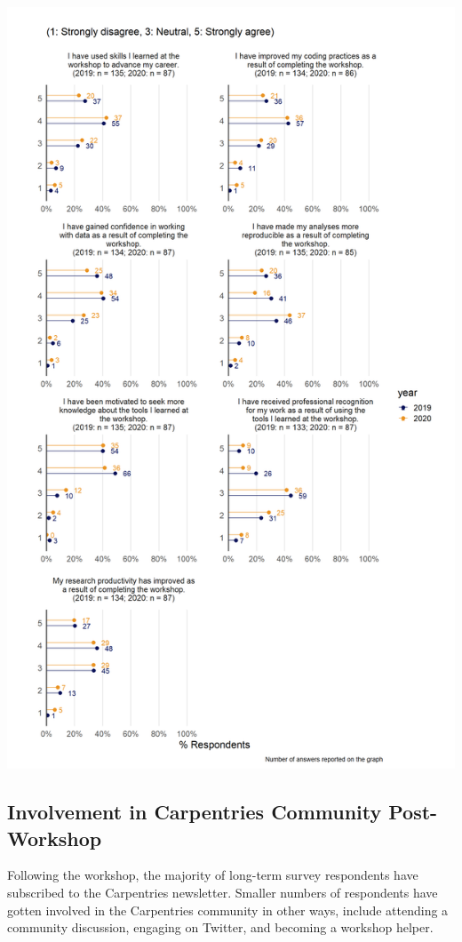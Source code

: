 \documentclass[
]{article}
\makeatletter
\def\maxwidth{\ifdim\Gin@nat@width>\linewidth\linewidth\else\Gin@nat@width\fi}
\makeatother
\begin{document}
\includegraphics[width=\maxwidth]{../figures/2020-12-longterm-workshop_impact-1}

\hypertarget{involvement-in-carpentries-community-post-workshop}{%
\subsection{Involvement in Carpentries Community
Post-Workshop}\label{involvement-in-carpentries-community-post-workshop}}

Following the workshop, the majority of long-term survey respondents
have subscribed to the Carpentries newsletter. Smaller numbers of
respondents have gotten involved in the Carpentries community in other
ways, include attending a community discussion, engaging on Twitter, and
becoming a workshop helper.
\end{document}
